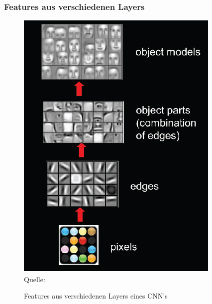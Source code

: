 \documentclass{beamer}
\begin{document}
\begin{frame}
	\frametitle{Features aus verschiedenen Layers}
	\begin{figure}
		\includegraphics[width=0.4\linewidth]{images/deep_learning.jpg}\\
		\hspace*{0pt}\hbox{\scriptsize Quelle:}
		\caption{Features aus verschiedenen Layers eines CNN's}
		\label{fig:deep_learning_features}
	\end{figure}
\end{frame}
\end{document}
